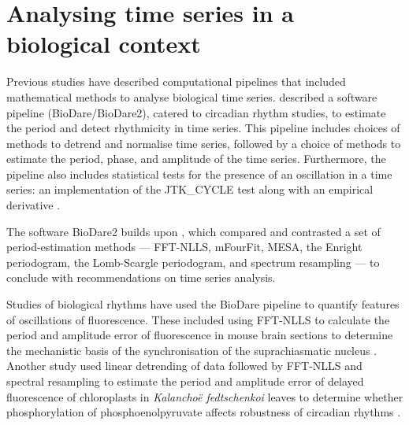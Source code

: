 \section{Analysing time series in a biological context}
\label{sec:analysis-literature}

Previous studies have described computational pipelines that included mathematical methods to analyse biological time series.
\textcite{zielinskiPeriodEstimationRhythm2022} described a software pipeline (BioDare/BioDare2), catered to circadian rhythm studies, to estimate the period and detect rhythmicity in time series.
This pipeline includes choices of methods to detrend and normalise time series, followed by a choice of methods to estimate the period, phase, and amplitude of the time series.
Furthermore, the pipeline also includes statistical tests for the presence of an oscillation in a time series: an implementation of the JTK\_CYCLE test \parencite{hughesJTK_CYCLEEfficientNonparametric2010} along with an empirical derivative \parencite{hutchisonImprovedStatisticalMethods2015a}.

The software BioDare2 builds upon \textcite{zielinskiStrengthsLimitationsPeriod2014}, which compared and contrasted a set of period-estimation methods ---
FFT-NLLS, mFourFit, MESA, the Enright periodogram, the Lomb-Scargle periodogram, and spectrum resampling --- to conclude with recommendations on time series analysis.

Studies of biological rhythms have used the BioDare pipeline to quantify features of oscillations of fluorescence.
These included using FFT-NLLS to calculate the period and amplitude error of fluorescence in mouse brain sections to determine the mechanistic basis of the synchronisation of the suprachiasmatic nucleus \parencite{hamnettVasoactiveIntestinalPeptide2019}.
Another study used linear detrending of data followed by FFT-NLLS and spectral resampling to estimate the period and amplitude error of delayed fluorescence of chloroplasts in \textit{Kalancho\"{e} fedtschenkoi} leaves to determine whether phosphorylation of phosphoenolpyruvate affects robustness of circadian rhythms \parencite{boxallPhosphorylationPhosphoenolpyruvateCarboxylase2017}.

